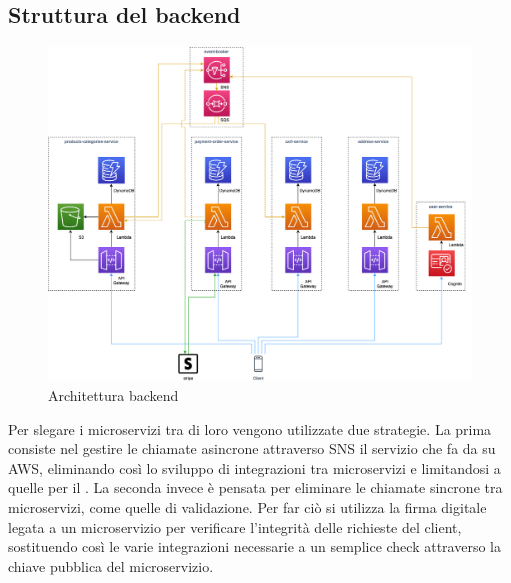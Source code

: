 \subsection{Struttura del backend}\label{Strutturabe}
\begin{figure}[H]
	\centering
	\includegraphics[scale=0.4]{Immagini/Backend/AWSArchitecture.png}
	\caption{Architettura backend}
	\label{fig:backend}
\end{figure}
Per slegare i microservizi tra di loro vengono utilizzate due strategie. La prima consiste nel gestire le chiamate asincrone attraverso SNS il servizio che fa da  su AWS, eliminando così lo sviluppo di integrazioni tra microservizi e limitandosi a quelle per il .
La seconda invece è pensata per eliminare le chiamate sincrone tra microservizi, come quelle di validazione. Per far ciò si utilizza la firma digitale legata a un microservizio per verificare l'integrità delle richieste del client, sostituendo così le varie integrazioni necessarie a un semplice check attraverso la chiave pubblica del microservizio.

